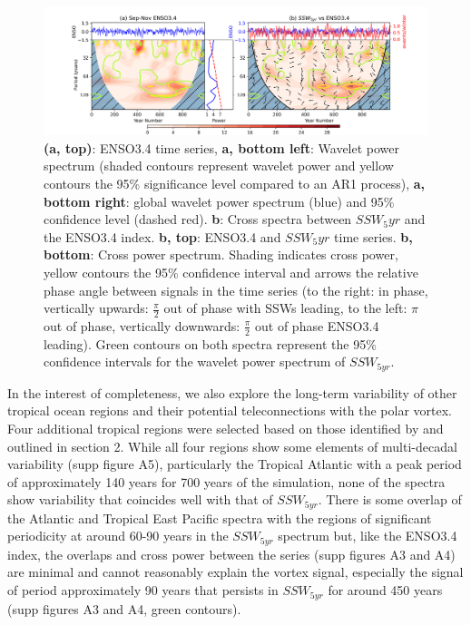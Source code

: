 \documentclass[wcd, manuscript]{copernicus}
\begin{document}
\begin{center}
\begin{figure}[h!]
\noindent\includegraphics[width = \linewidth]{new_changed_figures/ENSO_wavelet_combined_new_levels.png}
\caption{\textbf{(a, top)}: ENSO3.4 time series, \textbf{a, bottom left}: Wavelet power spectrum (shaded contours represent wavelet power and yellow contours the 95\% significance level compared to an AR1 process), \textbf{a, bottom right}: global wavelet power spectrum (blue) and 95\% confidence level (dashed red). \textbf{b}: Cross spectra between $SSW_5yr$ and the ENSO3.4 index. \textbf{b, top}: ENSO3.4 and $SSW_5yr$ time series. \textbf{b, bottom}: Cross power spectrum. Shading indicates cross power, yellow contours the 95\% confidence interval and arrows the relative phase angle between signals in the time series (to the right: in phase, vertically upwards: $\frac{\pi}{2}$ out of phase with SSWs leading, to the left: $\pi$ out of phase, vertically downwards: $\frac{\pi}{2}$ out of phase ENSO3.4 leading). Green contours on both spectra represent the 95\% confidence intervals for the wavelet power spectrum of $SSW_{5yr}$.}
\end{figure}
\end{center}

In the interest of completeness, we also explore the long-term variability of other tropical ocean regions and their potential teleconnections with the polar vortex. Four additional tropical regions were selected based on those identified by \cite{Scaife2016} and outlined in section 2. While all four regions show some elements of multi-decadal variability (supp figure A5), particularly the Tropical Atlantic with a peak period of approximately 140 years for 700 years of the simulation, none of the spectra show variability that coincides well with that of $SSW_{5yr}$. There is some overlap of the Atlantic and Tropical East Pacific spectra with the regions of significant periodicity at around 60-90 years in the $SSW_{5yr}$ spectrum but, like the ENSO3.4 index, the overlaps and cross power between the series (supp figures A3 and A4) are minimal and cannot reasonably explain the vortex signal, especially the signal of period approximately 90 years that persists in $SSW_{5yr}$ for around 450 years (supp figures A3 and A4, green contours).
\end{document}
